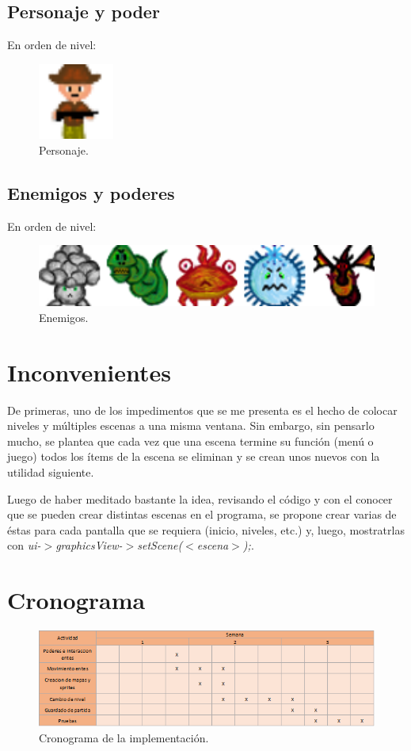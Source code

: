 \documentclass{article}
\begin{document}
\newpage
\subsection{Personaje y poder}
\par En orden de nivel:
\begin{figure}[h]
\includegraphics[width=2.5cm]{imagenes/PERSONAJE.png}
\centering
\caption{Personaje.}
\end{figure}

\subsection{Enemigos y poderes}
\par En orden de nivel:
\begin{figure}[h]
\includegraphics[width=12cm]{imagenes/villanos.png}
\centering
\caption{Enemigos.}
\end{figure}

\section{Inconvenientes}
De primeras, uno de los impedimentos que se me presenta es el hecho de colocar niveles y múltiples escenas a una misma ventana. Sin embargo, sin pensarlo mucho, se plantea que cada vez que una escena termine su función (menú o juego) todos los ítems de la escena se eliminan y se crean unos nuevos con la utilidad siguiente.
\par Luego de haber meditado bastante la idea, revisando el código y con el conocer que se pueden crear distintas escenas en el programa, se propone crear varias de éstas para cada pantalla que se requiera (inicio, niveles, etc.) y, luego, mostratrlas con \textsl{ui-$>$graphicsView-$>$setScene($<$escena$>$);}.

\section{Cronograma}
\begin{figure}[h]
\includegraphics[width=12cm]{imagenes/cronograma.png}
\centering
\caption{Cronograma de la implementación.}
\label{fig:diagram}
\end{figure}
\end{document}
